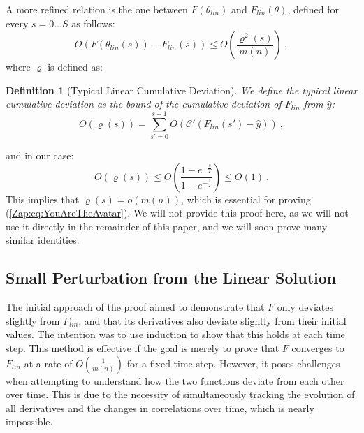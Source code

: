 \documentclass{article} %
\newtheorem{definition}{Definition}[section]
\begin{document}
A more refined relation is the one between \(F\left(\theta_{lin}\right)\) and \(F_{lin}\left(\theta\right)\), defined for every \(s = 0\ldots S\) as follows:
\begin{equation}
O\left(F\left(\theta_{lin}(s)\right) - F_{lin}\left(s\right)\right)
\leq
O\left(\frac{\varrho^{2}\left(s\right)}{m\left(n\right)}\right) \ ,
\label{Zap:eq:YouAreTheAvatar}
\end{equation}
where \(\varrho\) is defined as:

\begin{definition}[Typical Linear Cumulative Deviation]
\label{def:AcuLinDev}
\textup
{We define the typical linear cumulative deviation as the bound of the cumulative deviation of \(F_{lin}\) from \(\hat{y}\):
\begin{equation}
O\left(\varrho\left(s\right)\right)
=
\sum_{s'=0}^{s-1}O\left(\mathcal{C}'\left(F_{lin}\left(s'\right)-\hat{y}\right)\right) \ ,
\end{equation}
}
\end{definition}
and in our case:
\begin{equation}
O\left(\varrho\left(s\right)\right) \leq O\left(\frac{1 - e^{-\frac{s}{T}}}{1 - e^{-\frac{1}{T}}}\right) \leq O\left(1\right) \ .
\end{equation}
This implies that \(\varrho(s) = o(m(n))\), which is essential for proving (\ref{Zap:eq:YouAreTheAvatar}). We will not provide this proof here, as we will not use it directly in the remainder of this paper, and we will soon prove many similar identities.

\subsection{Small Perturbation from the Linear Solution}

The initial approach of the proof aimed to demonstrate that \(F\) only deviates slightly from \(F_{lin}\), and that its derivatives also deviate slightly \textcolor{black}{from their initial values}. The intention was to use induction to show that this holds at each time step. This method is effective if the goal is merely to prove that \(F\) converges to \(F_{lin}\) at a rate of \(O\left(\frac{1}{m(n)}\right)\) for a fixed time step. However, it poses challenges when attempting to understand how the two functions deviate from each other over time. This is due to the necessity of simultaneously tracking the evolution of all derivatives and the changes in correlations over time, which is nearly impossible.
\end{document}
